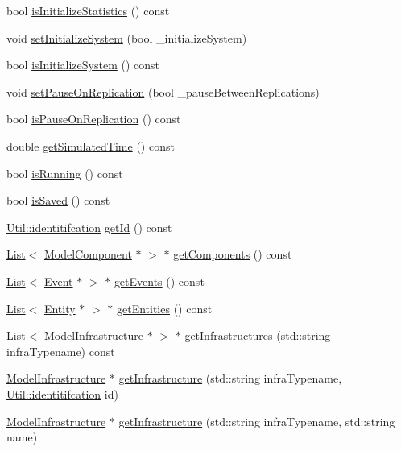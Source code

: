 \begin{DoxyCompactItemize}
bool \hyperlink{class_model_aefe1365d9a032fe1ac62991f45446d6a}{is\-Initialize\-Statistics} () const 
\item 
void \hyperlink{class_model_ac1299b28921f4d246319b2624e4ad98f}{set\-Initialize\-System} (bool \-\_\-initialize\-System)
\item 
bool \hyperlink{class_model_afd5e0285a55278e266045112ef795868}{is\-Initialize\-System} () const 
\item 
void \hyperlink{class_model_ae1f205bd8b328b3785694567eaeb77ef}{set\-Pause\-On\-Replication} (bool \-\_\-pause\-Between\-Replications)
\item 
bool \hyperlink{class_model_a269e5b3c45f3c7ce606205fec8f0b3b4}{is\-Pause\-On\-Replication} () const 
\item 
double \hyperlink{class_model_a74eb096b8229aa036d11adeeb8787599}{get\-Simulated\-Time} () const 
\item 
bool \hyperlink{class_model_a597bdaa89e9b6b396bded780e6d32fdf}{is\-Running} () const 
\item 
bool \hyperlink{class_model_a8d47ce2750e22e14e5249b724cdf4fd3}{is\-Saved} () const 
\item 
\hyperlink{class_util_ad17d458d9344b10bba64347e514d6d71}{Util\-::identitifcation} \hyperlink{class_model_abfd7753d30de6abea64b3f0846e097eb}{get\-Id} () const 
\item 
\hyperlink{class_list}{List}$<$ \hyperlink{class_model_component}{Model\-Component} $\ast$ $>$ $\ast$ \hyperlink{class_model_ae5773d78fc47cb35be7fbeb74b7d63e4}{get\-Components} () const 
\item 
\hyperlink{class_list}{List}$<$ \hyperlink{class_event}{Event} $\ast$ $>$ $\ast$ \hyperlink{class_model_a841c78bda0eb27c652c6921094dc5921}{get\-Events} () const 
\item 
\hyperlink{class_list}{List}$<$ \hyperlink{class_entity}{Entity} $\ast$ $>$ $\ast$ \hyperlink{class_model_ae09e777b481981772818ea3fd2880c4c}{get\-Entities} () const 
\item 
\hyperlink{class_list}{List}$<$ \hyperlink{class_model_infrastructure}{Model\-Infrastructure} $\ast$ $>$ $\ast$ \hyperlink{class_model_a43ca6ff93bd0b9fbc4c2792962e6b4ed}{get\-Infrastructures} (std\-::string infra\-Typename) const 
\item 
\hyperlink{class_model_infrastructure}{Model\-Infrastructure} $\ast$ \hyperlink{class_model_ab460d8d215b5e4fb353f129c04493fa5}{get\-Infrastructure} (std\-::string infra\-Typename, \hyperlink{class_util_ad17d458d9344b10bba64347e514d6d71}{Util\-::identitifcation} id)
\item 
\hyperlink{class_model_infrastructure}{Model\-Infrastructure} $\ast$ \hyperlink{class_model_ad6711b51ea9feeacb59eaf70cc8faaed}{get\-Infrastructure} (std\-::string infra\-Typename, std\-::string name)
\end{DoxyCompactItemize}


